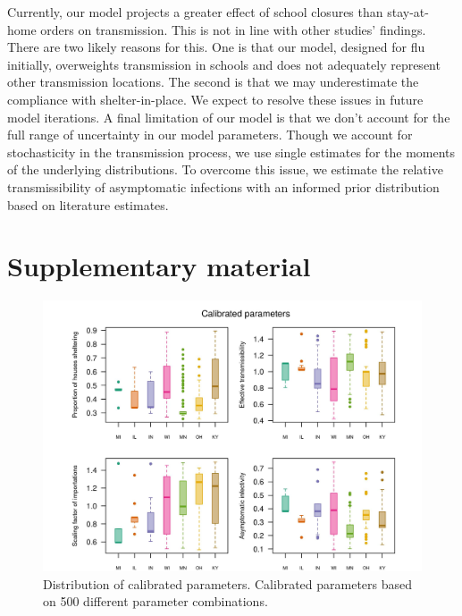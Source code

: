 \documentclass[11pt]{article}
\begin{document}
Currently, our model projects a greater effect of school closures than stay-at-home orders on transmission. This is not in line with other studies’ findings. There are two likely reasons for this. One is that our model, designed for flu initially, overweights transmission in schools and does not adequately represent other transmission locations. The second is that we may underestimate the compliance with shelter-in-place. We expect to resolve these issues in future model iterations. A final limitation of our model is that we don’t account for the full range of uncertainty in our model parameters. Though we account for stochasticity in the transmission process, we use single estimates for the moments of the underlying distributions. To overcome this issue, we estimate the relative transmissibility of asymptomatic infections with an informed prior distribution based on literature estimates. 

\clearpage
\printbibliography


\section*{Supplementary material}
\setcounter{table}{0}
\renewcommand{\thetable}{S\arabic{table}}%
\setcounter{figure}{0}
\renewcommand{\thefigure}{S\arabic{figure}}%

\begin{figure}[hb!]
\centering
\includegraphics[width=\textwidth]{../figures/report_figure_calibrated_parameters.jpeg} 
\caption{\label{fig_calibrated_parameters}Distribution of calibrated parameters. Calibrated parameters based on 500 different parameter combinations.}
\end{figure}
\end{document}
